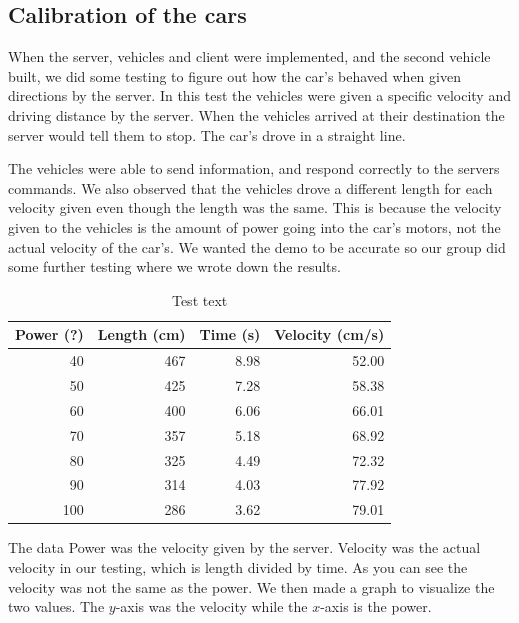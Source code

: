 \subsection{Calibration of the cars}
When the server, vehicles and client were implemented, and the second vehicle built, we did some testing to figure out how the car’s behaved when given directions by the server. In this test the vehicles were given a specific velocity and driving distance by the server. When the vehicles arrived at their destination the server would tell them to stop. The car’s drove in a straight line.

The vehicles were able to send information, and respond correctly to the servers commands. We also observed that the vehicles drove a different length for each velocity given even though the length was the same. This is because the velocity given to the vehicles is the amount of power going into the car’s motors, not the actual velocity of the car’s. We wanted the demo to be accurate so our group did some further testing where we wrote down the results. 

\begin{table}
	\begin{center}
		\begin{tabular}{rrrr}
			\hline
			Power (?) & Length (cm) & Time (s) & Velocity (cm/s) \\
			\hline
			40 & 467 & 8.98 & 52.00 \\
			50 & 425 & 7.28 & 58.38 \\
			60 & 400 & 6.06 & 66.01 \\
			70 & 357 & 5.18 & 68.92 \\
			80 & 325 & 4.49 & 72.32 \\
			90 & 314 & 4.03 & 77.92 \\
			100 & 286 & 3.62 & 79.01 \\
			\hline
		\end{tabular}
		\caption{Test text}
	\end{center}
\end{table}

The data Power was the velocity given by the server. Velocity was the actual velocity in our testing, which is length divided by time. As you can see the velocity was not the same as the power. We then made a graph to visualize the two values. The $y$-axis was the velocity while the $x$-axis is the power.

